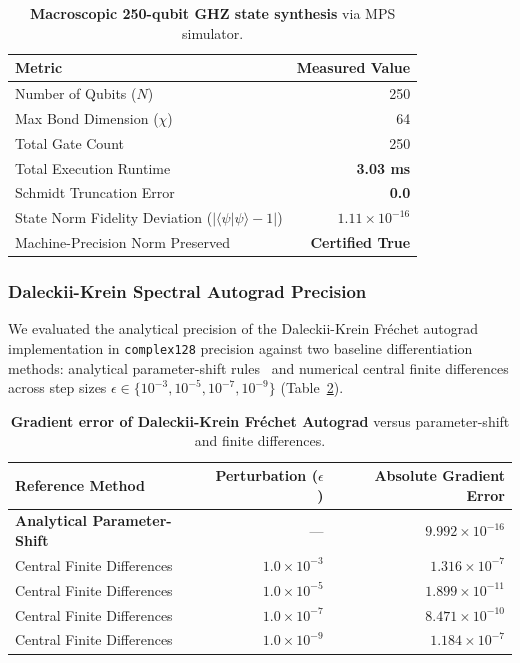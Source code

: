 \documentclass[aps,prx,twocolumn,superscriptaddress,nofootinbib]{revtex4-2}
\newcommand{\braket}[2]{\langle#1|#2\rangle}
\begin{document}
\begin{table}[h]
\centering
\caption{\textbf{Macroscopic 250-qubit GHZ state synthesis} via MPS simulator.}
\label{tab:mps_ghz}
\begin{tabular}{@{}lr@{}}
\toprule
\textbf{Metric} & \textbf{Measured Value} \\
\midrule
Number of Qubits ($N$) & 250 \\
Max Bond Dimension ($\chi$) & 64 \\
Total Gate Count & 250 \\
Total Execution Runtime & \textbf{3.03 ms} \\
Schmidt Truncation Error & \textbf{0.0} \\
State Norm Fidelity Deviation ($|\braket{\psi}{\psi}-1|$) & \textbf{$1.11 \times 10^{-16}$} \\
Machine-Precision Norm Preserved & \textbf{Certified True} \\
\bottomrule
\end{tabular}
\end{table}

\subsubsection{Daleckii-Krein Spectral Autograd Precision}
We evaluated the analytical precision of the Daleckii-Krein Fr\'echet autograd implementation in \texttt{complex128} precision against two baseline differentiation methods: analytical parameter-shift rules~\cite{schuld2019evaluating} and numerical central finite differences across step sizes $\epsilon \in \{10^{-3}, 10^{-5}, 10^{-7}, 10^{-9}\}$ (Table~\ref{tab:daleckii_krein_precision}).

\begin{table}[h]
\centering
\caption{\textbf{Gradient error of Daleckii-Krein Fr\'echet Autograd} versus parameter-shift and finite differences.}
\label{tab:daleckii_krein_precision}
\begin{tabular}{@{}lrr@{}}
\toprule
\textbf{Reference Method} & \textbf{Perturbation ($\epsilon$)} & \textbf{Absolute Gradient Error} \\
\midrule
\textbf{Analytical Parameter-Shift} & --- & \textbf{$9.992 \times 10^{-16}$} \\
Central Finite Differences & $1.0 \times 10^{-3}$ & $1.316 \times 10^{-7}$ \\
Central Finite Differences & $1.0 \times 10^{-5}$ & $1.899 \times 10^{-11}$ \\
Central Finite Differences & $1.0 \times 10^{-7}$ & $8.471 \times 10^{-10}$ \\
Central Finite Differences & $1.0 \times 10^{-9}$ & $1.184 \times 10^{-7}$ \\
\bottomrule
\end{tabular}
\end{table}
\end{document}
